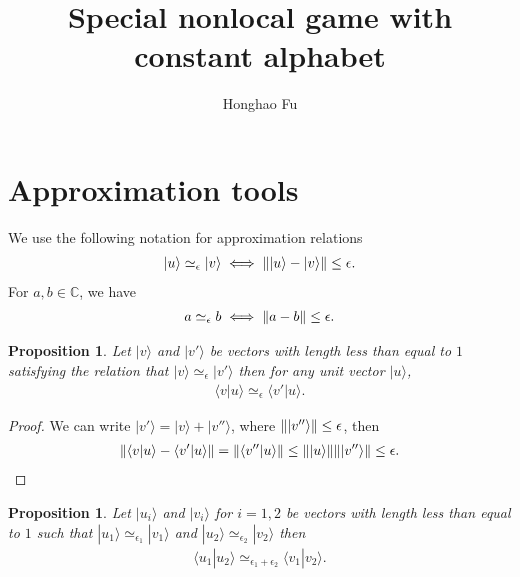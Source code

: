 \documentclass[11pt,letterpaper]{article}
\newcommand{\ket}[1]{|#1\rangle}
\newcommand{\braket}[2]{\langle#1|#2\rangle}
\DeclarePairedDelimiter{\norm}{\lVert}{\rVert}
\newcommand{\C}{\mathbb{C}}
\newcommand{\1}{\mathbb{1}}
\newcommand{\ep}{\epsilon}
\newcommand{\appd}[1]{\simeq_{#1}}
\newtheorem{proposition}[theorem]{Proposition}
\theoremstyle{definition}
\begin{document}
\title{Special nonlocal game with constant alphabet}

\author[1]{Honghao Fu}


\renewcommand\Affilfont{\itshape\small}


\maketitle

\section{Approximation tools}
We use the following notation for approximation relations
\begin{align}
	\ket{u} \appd{\epsilon} \ket{v} \iff \norm{\ket{u} - \ket{v}} \leq \epsilon. 
\end{align}
For $a,b \in \C$, we have
\begin{align}
	a \appd{\epsilon} b \iff \norm{a-b} \leq \epsilon.
\end{align}
\begin{proposition}
	\label{prop:inner_pd}
	Let $\ket{v}$ and $\ket{v'}$ be vectors with length less than equal to $1$ satisfying the relation that $\ket{v} \appd{\epsilon} \ket{v'}$
	then for any unit vector $\ket{u}$,
	\begin{align}
		 \braket{v}{u} \appd{\ep} \braket{v'}{u} .
	\end{align}	
\end{proposition}
\begin{proof}
	We can write $\ket{v'} = \ket{v} + \ket{v''}$, where $\norm{\ket{v''}} \leq \epsilon$,
	then
	\begin{align}
	\norm{ \braket{v}{u} - \braket{v'}{u} } = \norm{\braket{v''}{u}} \leq \norm{\ket{u}}\norm{\ket{v''}} \leq \epsilon.
	\end{align}
\end{proof}
\begin{proposition}
	Let $\ket{u_i}$ and $\ket{v_i}$ for $i = 1,2$ be vectors with length less than equal to $1$
	such that 
	$\ket{u_1} \appd{\ep_1} \ket{v_1}$ and $\ket{u_2} \appd{\ep_2} \ket{v_2}$
	then 
	\begin{align}
		\braket{u_1}{u_2} \appd{\ep_1+ \ep_2} \braket{v_1}{v_2}.
	\end{align}
\end{proposition}
\end{document}
